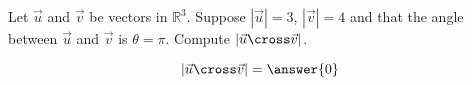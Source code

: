 \documentclass{ximera}
\author{Gregory Hartman \and Matthew Carr}
\begin{document}
\begin{exercise}
Let $\vec{u}$ and $\vec{v}$ be vectors in $\mathbb{R}^3$. Suppose
$|\vec{u}|=3$, $|\vec{v}|=4$ and that the angle between $\vec{u}$ and
$\vec{v}$ is $\theta=\pi$. Compute $|\vec{u}\cross\vec{v}|$.

\begin{prompt}
\[
|\vec{u}\cross\vec{v}|=\answer{0}
\]
\end{prompt}


\end{exercise}
\end{document}
